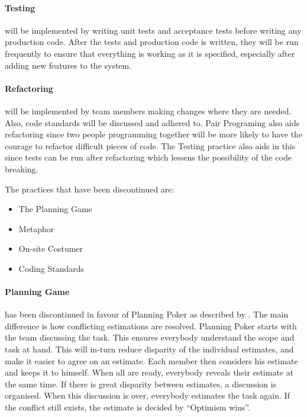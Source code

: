 \paragraph{Testing} will be implemented by writing unit tests and acceptance tests before writing any production code. After the tests and production code is written, they will be run frequently to ensure that everything is working as it is specified, especially after adding new features to the system.

\paragraph{Refactoring} will be implemented by team members making changes where they are needed. Also, code standards will be discussed and adhered to. Pair Programing also aids refactoring since two people programming together will be more likely to have the courage to refactor difficult pieces of code. The Testing practice also aids in this since tests can be run after refactoring which lessens the possibility of the code breaking.



The practices that have been discontinued are:
\begin{itemize}
\item The Planning Game
\item Metaphor
\item On-site Costumer
\item Coding Standards
\end{itemize}

\paragraph{Planning Game} has been discontinued in favour of Planning Poker as described by \citet{xp:planningPoker}.
The main difference is how conflicting estimations are resolved.
Planning Poker starts with the team discussing the task. This ensures everybody understand the scope and task at hand. This will in-turn reduce disparity of the individual estimates, and make it easier to agree on an estimate. Each member then considers his estimate and keeps it to himself. When all are ready, everybody reveals their estimate at the same time. If there is great disparity between estimates, a discussion is organised. When this discussion is over, everybody estimates the task again. If the conflict still exists, the estimate is decided by ``Optimism wins''.

